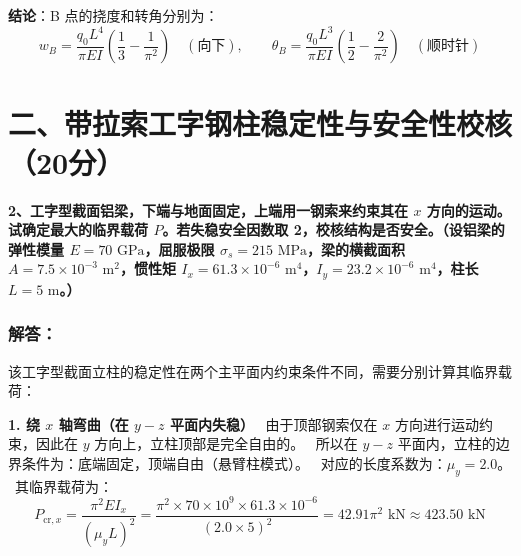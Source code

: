 \documentclass[11pt,a4paper]{ctexrep}
\begin{document}
{\textbf{结论}：B 点的挠度和转角分别为：
\[
    w_B = \frac{q_0 L^4}{\pi EI} \left( \frac{1}{3} - \frac{1}{\pi^2} \right) \quad (\text{向下}), \qquad \theta_B = \frac{q_0 L^3}{\pi EI} \left( \frac{1}{2} - \frac{2}{\pi^2} \right) \quad (\text{顺时针})
\]




\section*{二、带拉索工字钢柱稳定性与安全性校核（20分）}

\textbf{2、工字型截面铝梁，下端与地面固定，上端用一钢索来约束其在 $x$ 方向的运动。试确定最大的临界载荷 $P$。若失稳安全因数取 2，校核结构是否安全。（设铝梁的弹性模量 $E=70\text{ GPa}$，屈服极限 $\sigma_s=215\text{ MPa}$，梁的横截面积 $A=7.5 \times 10^{-3}\text{ m}^2$，惯性矩 $I_x=61.3 \times 10^{-6}\text{ m}^4$，$I_y=23.2 \times 10^{-6}\text{ m}^4$，柱长 $L=5\text{ m}$。）}

\begin{center}
\end{center}

\subsubsection*{解答：}

该工字型截面立柱的稳定性在两个主平面内约束条件不同，需要分别计算其临界载荷：

\textbf{1. 绕 $x$ 轴弯曲（在 $y-z$ 平面内失稳）}
\noindent\textbullet\ 由于顶部钢索仅在 $x$ 方向进行运动约束，因此在 $y$ 方向上，立柱顶部是完全自由的。
\noindent\textbullet\ 所以在 $y-z$ 平面内，立柱的边界条件为：底端固定，顶端自由（悬臂柱模式）。
\noindent\textbullet\ 对应的长度系数为：$\mu_y = 2.0$。
\noindent\textbullet\ 其临界载荷为：
    \[
        P_{\text{cr}, x} = \frac{\pi^2 E I_x}{(\mu_y L)^2} = \frac{\pi^2 \times 70 \times 10^9 \times 61.3 \times 10^{-6}}{(2.0 \times 5)^2} = 42.91 \pi^2\text{ kN} \approx 423.50\text{ kN}
    \]

}
\end{document}
